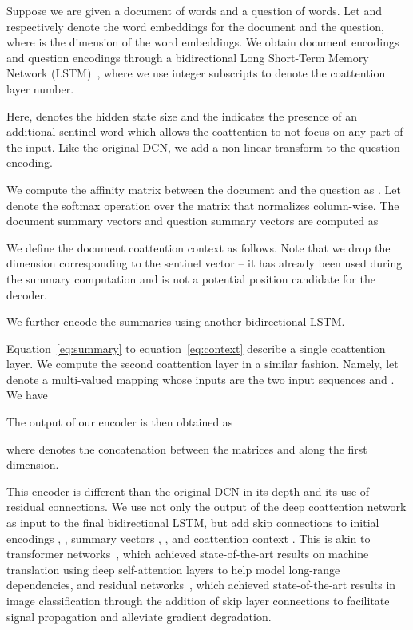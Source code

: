\documentclass{article} \usepackage{iclr2018_conference,times}
\begin{document}
Suppose we are given a document of  words and a question of  words.
Let  and  respectively denote the word embeddings for the document and the question, where  is the dimension of the word embeddings.
We obtain document encodings  and question encodings  through a bidirectional Long Short-Term Memory Network (LSTM)~\citep{Hochreiter1997LongSM}, where we use integer subscripts to denote the coattention layer number.



Here,  denotes the hidden state size and the  indicates the presence of an additional sentinel word which allows the coattention to not focus on any part of the input.
Like the original DCN, we add a non-linear transform to the question encoding.

We compute the affinity matrix between the document and the question as .
Let  denote the softmax operation over the matrix  that normalizes  column-wise.
The document summary vectors and question summary vectors are computed as



We define the document coattention context as follows.
Note that we drop the dimension corresponding to the sentinel vector -- it has already been used during the summary computation and is not a potential position candidate for the decoder.



We further encode the summaries using another bidirectional LSTM.



Equation~\ref{eq:summary} to equation~\ref{eq:context} describe a single coattention layer.
We compute the second coattention layer in a similar fashion.
Namely, let  denote a multi-valued mapping whose inputs are the two input sequences  and .
We have



The output of our encoder is then obtained as



where  denotes the concatenation between the matrices  and  along the first dimension.


This encoder is different than the original DCN in its depth and its use of residual connections.
We use not only the output of the deep coattention network  as input to the final bidirectional LSTM, but add skip connections to initial encodings , , summary vectors , , and coattention context .
This is akin to transformer networks~\citep{Vaswani2017AttentionIA}, which achieved state-of-the-art results on machine translation using deep self-attention layers to help model long-range dependencies, and residual networks~\citep{He2016DeepRL}, which achieved state-of-the-art results in image classification through the addition of skip layer connections to facilitate signal propagation and alleviate gradient degradation.
\end{document}
